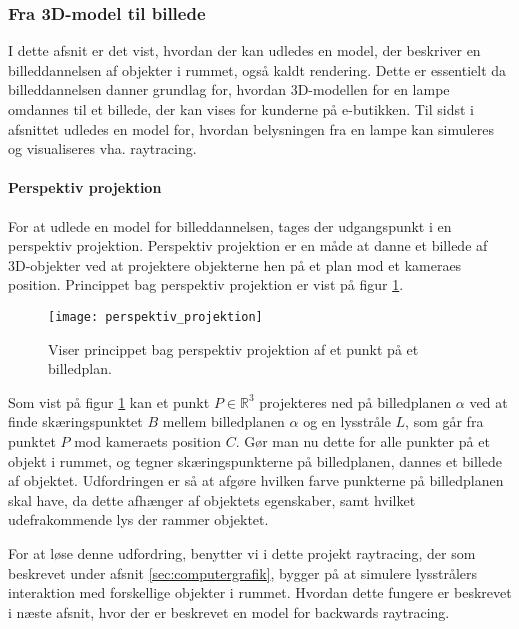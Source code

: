 \subsubsection{Fra 3D-model til billede}
I dette afsnit er det vist, hvordan der kan udledes en model, der beskriver en billeddannelsen af objekter i rummet, også kaldt rendering. Dette er essentielt da billeddannelsen danner grundlag for, hvordan 3D-modellen for en lampe omdannes til et billede, der kan vises for kunderne på e-butikken. Til sidst i afsnittet udledes en model for, hvordan belysningen fra en lampe kan simuleres og visualiseres vha. raytracing. 

\paragraph{Perspektiv projektion}
For at udlede en model for billeddannelsen, tages der udgangspunkt i en perspektiv projektion. Perspektiv projektion er en måde at danne et billede af 3D-objekter ved at projektere objekterne hen på et plan mod et kameraes position\cite{fig:perspective_projection}. Princippet bag perspektiv projektion er vist på figur \ref{fig:perspektiv_projektion}.

\begin{figure}[H]
  \label{fig:perspektiv_projektion}
  \centering
  \texttt{[image: perspektiv\_projektion]}
  \caption{Viser princippet bag perspektiv projektion af et punkt på et billedplan.}
\end{figure}

Som vist på figur \ref{fig:perspektiv_projektion} kan et punkt $P\in \mathbb{R}^3$ projekteres ned på billedplanen $\alpha$ ved at finde skæringspunktet $B$ mellem billedplanen $\alpha$ og en lysstråle $L$, som går fra punktet $P$ mod kameraets position $C$. Gør man nu dette for alle punkter på et objekt i rummet, og tegner skæringspunkterne på billedplanen, dannes et billede af objektet. Udfordringen er så at afgøre hvilken farve punkterne på billedplanen skal have, da dette afhænger af objektets egenskaber, samt hvilket udefrakommende lys der rammer objektet. 

For at løse denne udfordring, benytter vi i dette projekt raytracing, der som beskrevet under afsnit \ref{sec:computergrafik}, bygger på at simulere lysstrålers interaktion med forskellige objekter i rummet. Hvordan dette fungere er beskrevet i næste afsnit, hvor der er beskrevet en model for backwards raytracing.

